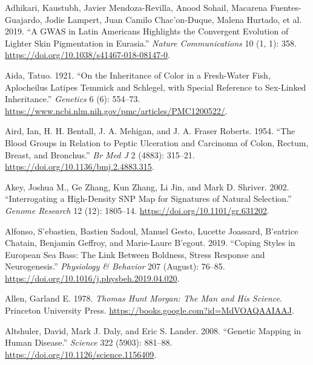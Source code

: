 \documentclass[
]{book}
\newlength{\cslhangindent}
\newlength{\cslentryspacingunit} %
\newenvironment{CSLReferences}[2] %
 {%
  \setlength{\parindent}{0pt}
  \ifodd #1
  \let\oldpar\par
  \def\par{\hangindent=\cslhangindent\oldpar}
  \fi
  \setlength{\parskip}{#2\cslentryspacingunit}
 }%
 {}
\begin{document}
\hypertarget{refs}{}
\begin{CSLReferences}{1}{0}
\leavevmode{}%
Adhikari, Kaustubh, Javier Mendoza-Revilla, Anood Sohail, Macarena Fuentes-Guajardo, Jodie Lampert, Juan Camilo Chac'on-Duque, Malena Hurtado, et al. 2019. {``A {GWAS} in {Latin Americans} Highlights the Convergent Evolution of Lighter Skin Pigmentation in {Eurasia}.''} \emph{Nature Communications} 10 (1, 1): 358. \url{https://doi.org/10.1038/s41467-018-08147-0}.

\leavevmode{}%
Aida, Tatuo. 1921. {``On the {Inheritance} of {Color} in a {Fresh-Water Fish}, {Aplocheilus Latipes Temmick} and {Schlegel}, with {Special Reference} to {Sex-Linked Inheritance}.''} \emph{Genetics} 6 (6): 554--73. \url{https://www.ncbi.nlm.nih.gov/pmc/articles/PMC1200522/}.

\leavevmode{}%
Aird, Ian, H. H. Bentall, J. A. Mehigan, and J. A. Fraser Roberts. 1954. {``The {Blood Groups} in {Relation} to {Peptic Ulceration} and {Carcinoma} of {Colon}, {Rectum}, {Breast}, and {Bronchus}.''} \emph{Br Med J} 2 (4883): 315--21. \url{https://doi.org/10.1136/bmj.2.4883.315}.

\leavevmode{}%
Akey, Joshua M., Ge Zhang, Kun Zhang, Li Jin, and Mark D. Shriver. 2002. {``Interrogating a {High-Density SNP Map} for {Signatures} of {Natural Selection}.''} \emph{Genome Research} 12 (12): 1805--14. \url{https://doi.org/10.1101/gr.631202}.

\leavevmode{}%
Alfonso, S'ebastien, Bastien Sadoul, Manuel Gesto, Lucette Joassard, B'eatrice Chatain, Benjamin Geffroy, and Marie-Laure B'egout. 2019. {``Coping Styles in {European} Sea Bass: {The} Link Between Boldness, Stress Response and Neurogenesis.''} \emph{Physiology \& Behavior} 207 (August): 76--85. \url{https://doi.org/10.1016/j.physbeh.2019.04.020}.

\leavevmode{}%
Allen, Garland E. 1978. \emph{Thomas {Hunt Morgan}: {The Man} and {His Science}}. {Princeton University Press}. \url{https://books.google.com?id=MdVOAQAAIAAJ}.

\leavevmode{}%
Altshuler, David, Mark J. Daly, and Eric S. Lander. 2008. {``Genetic {Mapping} in {Human Disease}.''} \emph{Science} 322 (5903): 881--88. \url{https://doi.org/10.1126/science.1156409}.


\end{CSLReferences}
\end{document}
